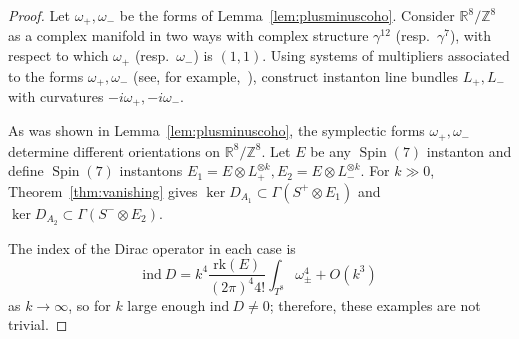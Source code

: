 \documentclass{article}
\newcommand{\real}{\mathbb{R}}
\newcommand{\inte}{\mathbb{Z}}
\newcommand{\rk}{\mathrm{rk}}
\DeclareMathOperator\Spin{Spin}
\theoremstyle{definition}
\theoremstyle{remark}
\begin{document}
\NoVanishing*
\begin{proof}
    Let $\omega_+, \omega_-$ be the forms of Lemma~\ref{lem:plusminuscoho}.
    Consider $\real^8/\inte^8$ as a complex manifold in two ways with complex structure $\gamma^{12}$ (resp.\ $\gamma^7$), with respect to which $\omega_+$ (resp.\ $\omega_-$) is $(1,1)$.
    Using systems of multipliers associated to the forms $\omega_+, \omega_-$ (see, for example,~\cite[Theorem~2.6]{beauvilleThetaFunctionsOld}), construct instanton line bundles $L_+, L_-$ with curvatures $-i \omega_+, -i \omega_-$.

    As was shown in Lemma~\ref{lem:plusminuscoho}, the symplectic forms $ \omega_+, \omega_-$ determine different orientations on $\real^8 / \inte^8$.
    Let $E$ be any $\Spin(7)$ instanton and define $\Spin(7)$ instantons $E_1 = E \otimes L_+^{\otimes k}, E_2 = E \otimes L_-^{\otimes k}$.
    For $k \gg 0$, Theorem~\ref{thm:vanishing} gives $\ker D_{A_1} \subset \Gamma(S^+ \otimes E_1)$ and $\ker D_{A_2} \subset \Gamma(S^- \otimes E_2)$. 

    The index of the Dirac operator in each case is
    \[
        \mathrm{ind}\ D = k^4 \frac{\rk(E)}{(2\pi)^4 4!} \int_{T^8} \omega_{\pm}^4 + O(k^3)
    \]
    as $k \to \infty$, so for $k$ large enough $\mathrm{ind}\ D \neq 0$; therefore, these examples are not trivial.
\end{proof}
\end{document}
